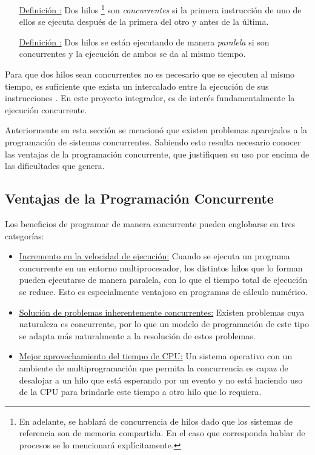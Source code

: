 \begin{itemize}
	\item [\underline{Definición \thedefinitionsCounter :} ] Dos hilos
	\footnote{En adelante, se hablará de concurrencia de hilos dado que los
	sistemas de referencia son de memoria compartida. En el caso que corresponda
	hablar de procesos se lo mencionará explícitamente.} son \textit{concurrentes}
	si la primera instrucción de uno de ellos se ejecuta después de la primera del
	otro y antes de la última.
	\item [\underline{Definición \thedefinitionsCounter :} ] Dos hilos 	se están
	ejecutando de manera \textit{paralela} si son concurrentes y la ejecución de
	ambos se da al mismo tiempo.
\end{itemize}

Para que dos hilos sean concurrentes no es necesario que se ejecuten al mismo
tiempo, es suficiente que exista un intercalado entre la ejecución de sus
instrucciones \cite{PalmaConcurrente}. En este proyecto integrador, es de
interés fundamentalmente la ejecución concurrente.

Anteriormente en esta sección se mencionó que existen problemas aparejados a la
programación de sistemas concurrentes. Sabiendo esto resulta necesario conocer
las ventajas de la programación concurrente, que justifiquen su uso por encima de
las dificultades que genera.

\subsection{Ventajas de la Programación Concurrente}

Los beneficios de programar de manera concurrente pueden englobarse en tres
categorías:

\begin{itemize}
	\item \underline{Incremento en la velocidad de ejecución:} Cuando se ejecuta un
	programa concurrente en un entorno multiprocesador, los distintos hilos que
	lo forman pueden ejecutarse de manera paralela, con lo que el tiempo total de
	ejecución se reduce. Esto es especialmente ventajoso en programas de cálculo
	numérico.
	\item \underline{Solución de problemas inherentemente concurrentes:} Existen
	problemas cuya naturaleza es concurrente, por lo que un modelo de programación
	de este tipo se adapta más naturalmente a la resolución de estos problemas.
	\item \underline{Mejor aprovechamiento del tiempo de CPU:} Un sistema operativo
	con un ambiente de multiprogramación que permita la concurrencia es capaz de
	desalojar a un hilo que está esperando por un evento y no está haciendo uso
	de la CPU para brindarle este tiempo a otro hilo que lo requiera.
\end{itemize}

